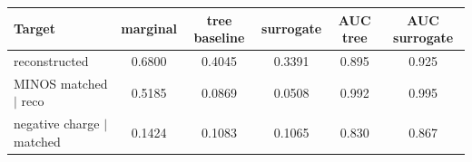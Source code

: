 \begin{tabular}{lccccc}
\toprule
Target & marginal & tree baseline & surrogate & AUC tree & AUC surrogate \\
\midrule
reconstructed & 0.6800 & 0.4045 & 0.3391 & 0.895 & 0.925 \\
MINOS matched $\mid$ reco & 0.5185 & 0.0869 & 0.0508 & 0.992 & 0.995 \\
negative charge $\mid$ matched & 0.1424 & 0.1083 & 0.1065 & 0.830 & 0.867 \\
\bottomrule
\end{tabular}
